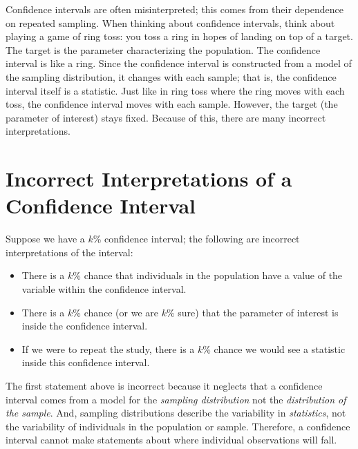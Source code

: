 \documentclass[
  letterpaper,
  DIV=11,
  numbers=noendperiod]{scrreprt}
\providecommand{\tightlist}{%
  \setlength{\itemsep}{0pt}\setlength{\parskip}{0pt}}\usepackage{longtable,booktabs,array}
\theoremstyle{plain}
\theoremstyle{definition}
\theoremstyle{definition}
\theoremstyle{remark}
\begin{document}
Confidence intervals are often misinterpreted; this comes from their
dependence on repeated sampling. When thinking about confidence
intervals, think about playing a game of ring toss: you toss a ring in
hopes of landing on top of a target. The target is the parameter
characterizing the population. The confidence interval is like a ring.
Since the confidence interval is constructed from a model of the
sampling distribution, it changes with each sample; that is, the
confidence interval itself is a statistic. Just like in ring toss where
the ring moves with each toss, the confidence interval moves with each
sample. However, the target (the parameter of interest) stays fixed.
Because of this, there are many incorrect interpretations.

\hypertarget{incorrect-interpretations-of-a-confidence-interval}{%
\section{Incorrect Interpretations of a Confidence
Interval}\label{incorrect-interpretations-of-a-confidence-interval}}

Suppose we have a \(k\)\% confidence interval; the following are
incorrect interpretations of the interval:

\begin{itemize}
\tightlist
\item
  There is a \(k\)\% chance that individuals in the population have a
  value of the variable within the confidence interval.
\item
  There is a \(k\)\% chance (or we are \(k\)\% sure) that the parameter
  of interest is inside the confidence interval.
\item
  If we were to repeat the study, there is a \(k\)\% chance we would see
  a statistic inside this confidence interval.
\end{itemize}

The first statement above is incorrect because it neglects that a
confidence interval comes from a model for the \emph{sampling
distribution} not the \emph{distribution of the sample}. And, sampling
distributions describe the variability in \emph{statistics}, not the
variability of individuals in the population or sample. Therefore, a
confidence interval cannot make statements about where individual
observations will fall.
\end{document}
